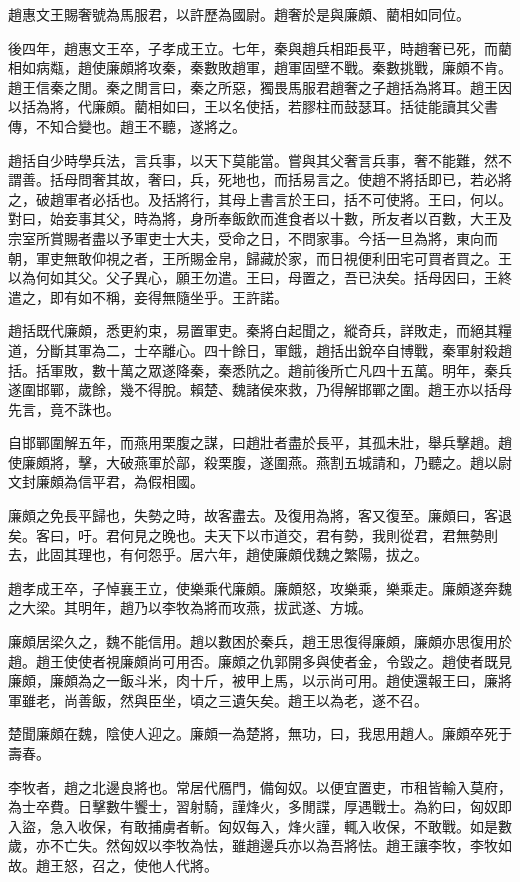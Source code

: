 趙惠文王賜奢號為馬服君，以許歷為國尉。趙奢於是與廉頗、藺相如同位。

後四年，趙惠文王卒，子孝成王立。七年，秦與趙兵相距長平，時趙奢已死，而藺相如病甐，趙使廉頗將攻秦，秦數敗趙軍，趙軍固壁不戰。秦數挑戰，廉頗不肯。趙王信秦之閒。秦之閒言曰，秦之所惡，獨畏馬服君趙奢之子趙括為將耳。趙王因以括為將，代廉頗。藺相如曰，王以名使括，若膠柱而鼓瑟耳。括徒能讀其父書傳，不知合變也。趙王不聽，遂將之。

趙括自少時學兵法，言兵事，以天下莫能當。嘗與其父奢言兵事，奢不能難，然不謂善。括母問奢其故，奢曰，兵，死地也，而括易言之。使趙不將括即已，若必將之，破趙軍者必括也。及括將行，其母上書言於王曰，括不可使將。王曰，何以。對曰，始妾事其父，時為將，身所奉飯飲而進食者以十數，所友者以百數，大王及宗室所賞賜者盡以予軍吏士大夫，受命之日，不問家事。今括一旦為將，東向而朝，軍吏無敢仰視之者，王所賜金帛，歸藏於家，而日視便利田宅可買者買之。王以為何如其父。父子異心，願王勿遣。王曰，母置之，吾已決矣。括母因曰，王終遣之，即有如不稱，妾得無隨坐乎。王許諾。

趙括既代廉頗，悉更約束，易置軍吏。秦將白起聞之，縱奇兵，詳敗走，而絕其糧道，分斷其軍為二，士卒離心。四十餘日，軍餓，趙括出銳卒自博戰，秦軍射殺趙括。括軍敗，數十萬之眾遂降秦，秦悉阬之。趙前後所亡凡四十五萬。明年，秦兵遂圍邯鄲，歲餘，幾不得脫。賴楚、魏諸侯來救，乃得解邯鄲之圍。趙王亦以括母先言，竟不誅也。

自邯鄲圍解五年，而燕用栗腹之謀，曰趙壯者盡於長平，其孤未壯，舉兵擊趙。趙使廉頗將，擊，大破燕軍於鄗，殺栗腹，遂圍燕。燕割五城請和，乃聽之。趙以尉文封廉頗為信平君，為假相國。

廉頗之免長平歸也，失勢之時，故客盡去。及復用為將，客又復至。廉頗曰，客退矣。客曰，吁。君何見之晚也。夫天下以市道交，君有勢，我則從君，君無勢則去，此固其理也，有何怨乎。居六年，趙使廉頗伐魏之繁陽，拔之。

趙孝成王卒，子悼襄王立，使樂乘代廉頗。廉頗怒，攻樂乘，樂乘走。廉頗遂奔魏之大梁。其明年，趙乃以李牧為將而攻燕，拔武遂、方城。

廉頗居梁久之，魏不能信用。趙以數困於秦兵，趙王思復得廉頗，廉頗亦思復用於趙。趙王使使者視廉頗尚可用否。廉頗之仇郭開多與使者金，令毀之。趙使者既見廉頗，廉頗為之一飯斗米，肉十斤，被甲上馬，以示尚可用。趙使還報王曰，廉將軍雖老，尚善飯，然與臣坐，頃之三遺矢矣。趙王以為老，遂不召。

楚聞廉頗在魏，陰使人迎之。廉頗一為楚將，無功，曰，我思用趙人。廉頗卒死于壽春。

李牧者，趙之北邊良將也。常居代鴈門，備匈奴。以便宜置吏，市租皆輸入莫府，為士卒費。日擊數牛饗士，習射騎，謹烽火，多閒諜，厚遇戰士。為約曰，匈奴即入盜，急入收保，有敢捕虜者斬。匈奴每入，烽火謹，輒入收保，不敢戰。如是數歲，亦不亡失。然匈奴以李牧為怯，雖趙邊兵亦以為吾將怯。趙王讓李牧，李牧如故。趙王怒，召之，使他人代將。

